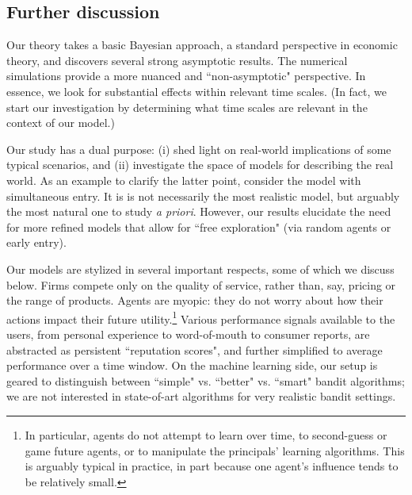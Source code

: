 \subsection{Further discussion}
\label{sec:discussion}

Our theory takes a basic Bayesian approach, a standard perspective in economic theory, and discovers several strong asymptotic results. The numerical simulations provide a more nuanced and ``non-asymptotic" perspective. In essence, we look for substantial effects within relevant time scales. (In fact, we start our investigation by determining what time scales are relevant in the context of our model.)


Our study has a dual purpose: (i) shed light on real-world implications of some typical scenarios, and (ii) investigate the space of models for describing the real world. As an example to clarify the latter point, consider the \HardMax model with simultaneous entry. It is is not necessarily the most realistic model, but arguably the most natural one to study \emph{a priori}. However, our results elucidate the need for more refined models that allow for ``free exploration" (\eg via random agents or early entry).

Our models are stylized in several important  respects, some of which we discuss below. Firms compete only on the quality of service, rather than, say, pricing or the range of products. Agents are myopic: they do not worry about how their actions impact their future utility.\footnote{In particular, agents do not attempt to learn over time, to second-guess or game future agents, or to manipulate the principals' learning algorithms. This is arguably typical in practice, in part because one agent's influence tends to be relatively small.}  Various performance signals available to the users, from personal experience to word-of-mouth to consumer reports, are abstracted as persistent ``reputation scores", and further simplified to average performance over a time window. On the machine learning side, our setup is geared to distinguish between ``simple" vs. ``better" vs. ``smart" bandit algorithms; we are not interested in state-of-art algorithms for very realistic bandit settings.



